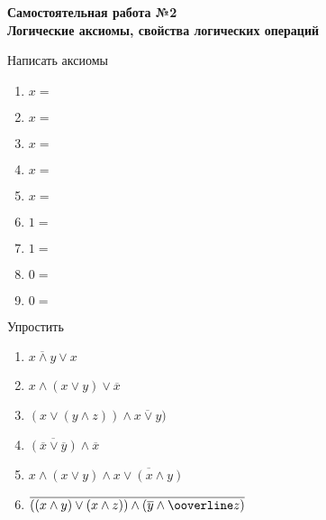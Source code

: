 



    \begin{center}
        \textbf{
            Самостоятельная работа №2\\Логические аксиомы, свойства логических операций
        }

        Написать аксиомы
    \end{center}

    \begin{enumerate}
        \item $x = $
        \item $x = $
        \item $x = $
        \item $x = $
        \item $x = $
        \item $1 = $
        \item $1 = $
        \item $0 = $
        \item $0 = $
    \end{enumerate}

    \begin{center}
        Упростить
    \end{center}
    \begin{enumerate}
        \item $\overline{x \wedge y} \vee x$
        \item $x \wedge (x \vee y) \vee \overline x$
        \item $(x \vee (y \wedge z))\wedge \overline{x \vee y})$
        \item $\overline{(\overline x \vee \overline y)} \wedge \overline x$
        \item $x \wedge (x \vee y) \wedge \overline{x \vee (x \wedge y)}$
        \item $\overline{((x \wedge y) \vee (x \wedge z)) \wedge (\overline y \wedge \ooverline z)}$
    \end{enumerate}

